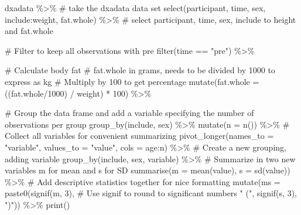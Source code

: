 \documentclass[
  11pt,
  letterpaper,
]{scrbook}
\newenvironment{Shaded}{\begin{snugshade}}{\end{snugshade}}
\newcommand{\AttributeTok}[1]{\textcolor[rgb]{0.40,0.45,0.13}{#1}}
\newcommand{\CommentTok}[1]{\textcolor[rgb]{0.37,0.37,0.37}{#1}}
\newcommand{\DecValTok}[1]{\textcolor[rgb]{0.68,0.00,0.00}{#1}}
\newcommand{\FunctionTok}[1]{\textcolor[rgb]{0.28,0.35,0.67}{#1}}
\newcommand{\NormalTok}[1]{\textcolor[rgb]{0.00,0.23,0.31}{#1}}
\newcommand{\SpecialCharTok}[1]{\textcolor[rgb]{0.37,0.37,0.37}{#1}}
\newcommand{\StringTok}[1]{\textcolor[rgb]{0.13,0.47,0.30}{#1}}
\begin{document}
\begin{Shaded}
\begin{Highlighting}[numbers=left,,]
\NormalTok{dxadata }\SpecialCharTok{\%\textgreater{}\%} \CommentTok{\# take the dxadata data set}
  \FunctionTok{select}\NormalTok{(participant, time, sex, include}\SpecialCharTok{:}\NormalTok{weight, fat.whole) }\SpecialCharTok{\%\textgreater{}\%} 
  \CommentTok{\# select participant, time, sex, include to height and fat.whole}
  
  \CommentTok{\# Filter to keep all observations with pre}
  \FunctionTok{filter}\NormalTok{(time }\SpecialCharTok{==} \StringTok{"pre"}\NormalTok{) }\SpecialCharTok{\%\textgreater{}\%}
  
  \CommentTok{\# Calculate body fat}
  \CommentTok{\# fat.whole in grams, needs to be divided by 1000 to express as kg}
  \CommentTok{\# Multiply by 100 to get percentage}
  \FunctionTok{mutate}\NormalTok{(}\AttributeTok{fat.whole =}\NormalTok{ ((fat.whole}\SpecialCharTok{/}\DecValTok{1000}\NormalTok{) }\SpecialCharTok{/}\NormalTok{ weight) }\SpecialCharTok{*} \DecValTok{100}\NormalTok{) }\SpecialCharTok{\%\textgreater{}\%}
  
  \CommentTok{\# Group the data frame and add a variable specifying the number of observations per group}
  \FunctionTok{group\_by}\NormalTok{(include, sex) }\SpecialCharTok{\%\textgreater{}\%}
  \FunctionTok{mutate}\NormalTok{(}\AttributeTok{n =} \FunctionTok{n}\NormalTok{()) }\SpecialCharTok{\%\textgreater{}\%}
  \CommentTok{\# Collect all variables for convenient summarizing}
  \FunctionTok{pivot\_longer}\NormalTok{(}\AttributeTok{names\_to =} \StringTok{"variable"}\NormalTok{, }
               \AttributeTok{values\_to =} \StringTok{"value"}\NormalTok{, }
               \AttributeTok{cols =}\NormalTok{ age}\SpecialCharTok{:}\NormalTok{n) }\SpecialCharTok{\%\textgreater{}\%}
  \CommentTok{\# Create a new grouping, adding variable}
  \FunctionTok{group\_by}\NormalTok{(include, sex, variable) }\SpecialCharTok{\%\textgreater{}\%}
  \CommentTok{\# Summarize in two new variables m for mean and s for SD}
  \FunctionTok{summarise}\NormalTok{(}\AttributeTok{m =} \FunctionTok{mean}\NormalTok{(value), }
            \AttributeTok{s =} \FunctionTok{sd}\NormalTok{(value)) }\SpecialCharTok{\%\textgreater{}\%}
  \CommentTok{\# Add descriptive statistics together for nice formatting}
  \FunctionTok{mutate}\NormalTok{(}\AttributeTok{ms =} \FunctionTok{paste0}\NormalTok{(}\FunctionTok{signif}\NormalTok{(m, }\DecValTok{3}\NormalTok{), }\CommentTok{\# Use signif to round to significant numbers}
                     \StringTok{" ("}\NormalTok{,}
                     \FunctionTok{signif}\NormalTok{(s, }\DecValTok{3}\NormalTok{), }
                     \StringTok{")"}\NormalTok{)) }\SpecialCharTok{\%\textgreater{}\%}
  \FunctionTok{print}\NormalTok{()}
\end{Highlighting}
\end{Shaded}
\end{document}
